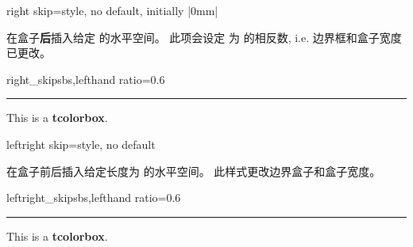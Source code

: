 \begin{docTcbKey}[][doc new=2014-11-07]{right skip}{=}{style, no default, initially |0mm|}

在盒子{\bf 后}插入给定  的水平空间。%
此项会设定   为  的相反数,
  i.e. 边界框和盒子宽度已更改。
\begin{exdispExample*}{right_skip}{sbs,lefthand ratio=0.6}
\noindent\rule{\linewidth}{2pt}

\begin{tcolorbox}[right skip=1cm,
    colframe=red!50!white]
  This is a \textbf{tcolorbox}.
\end{tcolorbox}
\end{exdispExample*}
\end{docTcbKey}



\begin{docTcbKey}[][doc new=2014-10-10]{leftright skip}{=}{style, no default}

  在盒子前后插入给定长度为  的水平空间。
  此样式更改边界盒子和盒子宽度。

  \begin{exdispExample*}{leftright_skip}{sbs,lefthand ratio=0.6}
\noindent\rule{\linewidth}{2pt}

\begin{tcolorbox}[leftright skip=1cm,
    colframe=red!50!white]
  This is a \textbf{tcolorbox}.
\end{tcolorbox}
\end{exdispExample*}
\end{docTcbKey}



